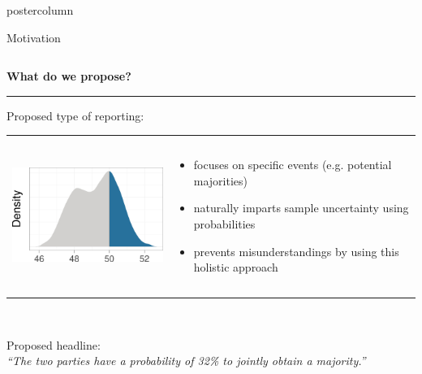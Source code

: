\documentclass[final,hyperref={pdfpagelabels=false}]{beamer}
\let\olditem\item
\renewcommand\item{\justifying\olditem} %
\newcommand{\bfBlue}[1]{\textcolor{koaladarkestblue}{\textbf{#1}}}
\newcommand{\blue}[1]{\textcolor{koaladarkestblue}{#1}}
\newcommand{\darkgray}[1]{\textcolor{koaladarkgray}{#1}}
\newcommand{\lightgray}[1]{\textcolor{koalagray}{#1}}
\newcommand{\colHeader}[1]{
  \vspace{-3ex}
  \begin{center}\centering
  \bfBlue{#1}
  \end{center}
  \vspace{-2ex}
  \textcolor{koalablue}{\hrule{}}
  \vspace{2ex}
}
\begin{document}
\begin{frame}
\begin{columns}
\begin{column}{1\textwidth}
\begin{beamercolorbox}[center,wd=\textwidth]{postercolumn}
\begin{minipage}[T]{.95\textwidth}
\begin{block}{\footnotesize Motivation}
\begin{columns}[t]

  \begin{column}{.475\textwidth}
  \colHeader{What do we propose?}
  Proposed type of reporting: \\[1cm]
  \begin{tabular}{p{9cm}p{25cm}}
  \includegraphics[height=5cm]{figures/motivation_density_highlighted}
  &
  \vspace{-4.8cm}
  \begin{itemize}
    \item focuses on specific events (e.g. potential majorities)
    \item naturally imparts sample uncertainty using probabilities
    \item prevents misunderstandings by using this holistic approach
  \end{itemize}
  \end{tabular}
  \\[10px]
  \begin{mdleftblue}
  \begin{minipage}{\textwidth}
  \lightgray{\footnotesize Proposed headline:}
  \\
  \vspace{-50px}
  \textit{\darkgray{``The two parties have a} \blue{probability of 32\%} \darkgray{to jointly obtain a majority.''}}
  \\[17px]
  \end{minipage}
  \end{mdleftblue}
  \vspace{60px}


\end{column}
\end{columns}
\end{block}
\end{minipage}
\end{beamercolorbox}
\end{column}
\end{columns}
\end{frame}
\end{document}
